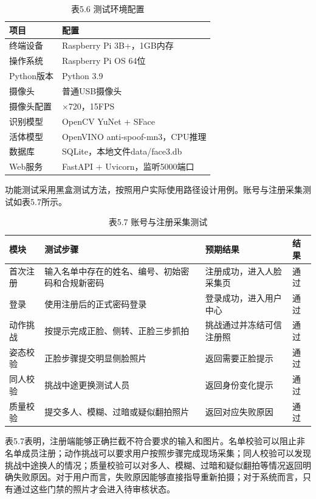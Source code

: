 \documentclass[UTF8]{heuthesis}
\begin{document}
\begingroup
\small
\begin{longtable}{|>{\raggedright\arraybackslash}p{}|>{\raggedright\arraybackslash}p{}|}
\caption{表5.6 测试环境配置}\\
\hline
项目 & 配置 \\
\hline
终端设备 & Raspberry Pi 3B+，1GB内存 \\
\hline
操作系统 & Raspberry Pi OS 64位 \\
\hline
Python版本 & Python 3.9 \\
\hline
摄像头 & 普通USB摄像头 \\
\hline
摄像头配置 & 1280×720，15FPS \\
\hline
识别模型 & OpenCV YuNet + SFace \\
\hline
活体模型 & OpenVINO anti-spoof-mn3，CPU推理 \\
\hline
数据库 & SQLite，本地文件data/face3.db \\
\hline
Web服务 & FastAPI + Uvicorn，监听5000端口 \\
\hline
\end{longtable}
\endgroup

功能测试采用黑盒测试方法，按照用户实际使用路径设计用例。账号与注册采集测试如表5.7所示。

\begingroup
\small
\begin{longtable}{|>{\raggedright\arraybackslash}p{}|>{\raggedright\arraybackslash}p{}|>{\raggedright\arraybackslash}p{}|>{\raggedright\arraybackslash}p{}|}
\caption{表5.7 账号与注册采集测试}\\
\hline
模块 & 测试步骤 & 预期结果 & 结果 \\
\hline
首次注册 & 输入名单中存在的姓名、编号、初始密码和合规新密码 & 注册成功，进入人脸采集页 & 通过 \\
\hline
登录 & 使用注册后的正式密码登录 & 登录成功，进入用户中心 & 通过 \\
\hline
动作挑战 & 按提示完成正脸、侧转、正脸三步抓拍 & 挑战通过并冻结可信注册照 & 通过 \\
\hline
姿态校验 & 正脸步骤提交明显侧脸照片 & 返回需要正脸提示 & 通过 \\
\hline
同人校验 & 挑战中途更换测试人员 & 返回身份变化提示 & 通过 \\
\hline
质量校验 & 提交多人、模糊、过暗或疑似翻拍照片 & 返回对应失败原因 & 通过 \\
\hline
\end{longtable}
\endgroup

表5.7表明，注册端能够正确拦截不符合要求的输入和图片。名单校验可以阻止非名单成员注册；动作挑战可以要求用户按照步骤完成现场采集；同人校验可以发现挑战中途换人的情况；质量校验可以对多人、模糊、过暗和疑似翻拍等情况返回明确失败原因。对于用户而言，失败原因能够直接指导重新拍摄；对于系统而言，只有通过这些门禁的照片才会进入待审核状态。
\end{document}
